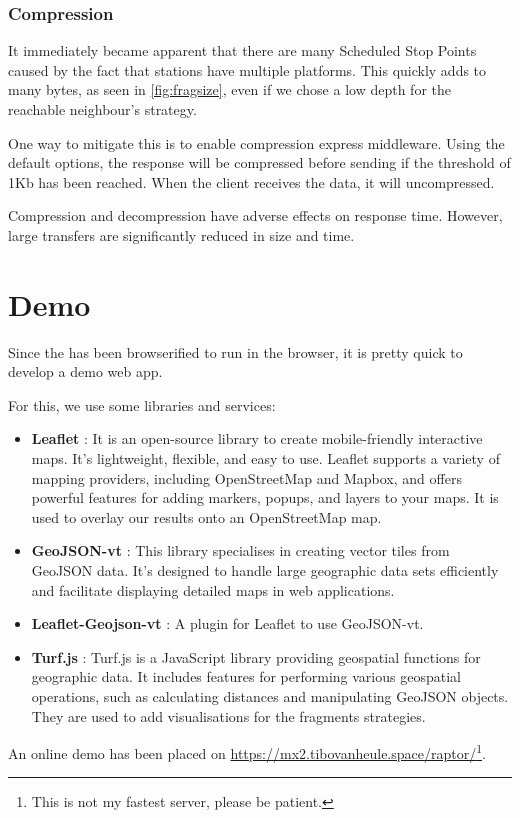 \subsubsection{Compression}
It immediately became apparent that there are many Scheduled Stop Points caused by the fact that stations have multiple platforms. This quickly adds to many bytes, as seen in \autoref{fig:fragsize}, even if we chose a low depth for the reachable neighbour's strategy.

One way to mitigate this is to enable compression express middleware\cite{noauthor_compression_2019}. Using the default options, the response will be compressed before sending if the threshold of 1Kb has been reached. When the client receives the data, it will uncompressed. 

Compression and decompression have adverse effects on response time. However, large transfers are significantly reduced in size and time. 

\section{Demo}\label{sec:demo}
Since the  has been browserified to run in the browser, it is pretty quick to develop a demo web app.

For this, we use some libraries and services:
\begin{itemize}
    \item \textbf{Leaflet} \cite{noauthor_leaflet_nodate}: It is an open-source library to create mobile-friendly interactive maps. It's lightweight, flexible, and easy to use. Leaflet supports a variety of mapping providers, including OpenStreetMap and Mapbox, and offers powerful features for adding markers, popups, and layers to your maps. It is used to overlay our results onto an OpenStreetMap map. 
    \item \textbf{GeoJSON-vt} \cite{noauthor_mapboxgeojson-vt_2024}: This library specialises in creating vector tiles from GeoJSON data. It's designed to handle large geographic data sets efficiently and facilitate displaying detailed maps in web applications. 
    \item \textbf{Leaflet-Geojson-vt} \cite{kshetri_iamteksonleaflet-geojson-vt_2024}: A plugin for Leaflet to use GeoJSON-vt.
    \item \textbf{Turf.js} \cite{noauthor_turfjs_nodate}: Turf.js is a JavaScript library providing geospatial functions for geographic data. It includes features for performing various geospatial operations, such as calculating distances and manipulating GeoJSON objects. They are used to add visualisations for the fragments strategies.
\end{itemize}

An online demo has been placed on \url{https://mx2.tibovanheule.space/raptor/}\footnote{This is not my fastest server, please be patient.}.

